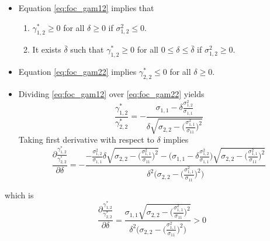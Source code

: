 \documentclass[14pt]{article}
\begin{document}
{\begin{itemize}
	\item Equation \ref{eq:foc_gam12} implies that
	\begin{enumerate}
		\item $\gamma_{1,2}^* \geq 0$ for all $\delta \geq 0$ if $\sigma_{1,2}^2 \leq 0$.
		\item It exists $\bar{\delta}$ such that $\gamma_{1,2}^* \geq 0$ for all $0 \leq \delta \leq \bar{\delta}$ if $\sigma_{1,2}^2 \geq 0$.
	\end{enumerate} 
	
	\item Equation \ref{eq:foc_gam22} implies $\gamma_{2,2}^* \leq 0$ for all $\delta \geq 0$.
	
	\item Dividing \ref{eq:foc_gam12} over \ref{eq:foc_gam22} yields
	$$
	\frac{\gamma_{1,2}^*}{\gamma_{2,2}^*} = - \frac{\sigma_{1,1} - \delta \frac{\sigma_{1,2}^2}{\sigma_{1,1}}}{\delta \sqrt{\sigma_{2,2} - \Big(\frac{\sigma_{1,1}^2}{\sigma_11}\Big)^2}} 
	$$
	Taking first derivative with respect to $\delta$ implies
	$$
	\frac{\partial \frac{\gamma_{1,2}^*}{\gamma_{2,2}^*}}{\partial \delta} = - \frac{- \frac{\sigma_{1,2}^2}{\sigma_{1,1}} \delta  \sqrt{\sigma_{2,2} - \Big(\frac{\sigma_{1,1}^2}{\sigma_11}\Big)^2}    - \Big( \sigma_{1,1} - \delta \frac{\sigma_{1,2}^2}{\sigma_{1,1}}  \Big)  \sqrt{\sigma_{2,2} - \Big(\frac{\sigma_{1,1}^2}{\sigma_11}\Big)^2}  }{\delta^2 \Big(   \sigma_{2,2} - \Big(\frac{\sigma_{1,1}^2}{\sigma_11}\Big)^2  \Big)}
	$$ 
\end{itemize}
which is
$$
\frac{\partial \frac{\gamma_{1,2}^*}{\gamma_{2,2}^*}}{\partial \delta} = \frac{ \sigma_{1,1}  \sqrt{\sigma_{2,2} - \Big(\frac{\sigma_{1,1}^2}{\sigma_11}\Big)^2}  }{\delta^2 \Big(   \sigma_{2,2} - \Big(\frac{\sigma_{1,1}^2}{\sigma_11}\Big)^2  \Big)} > 0
$$ 


}
\end{document}
